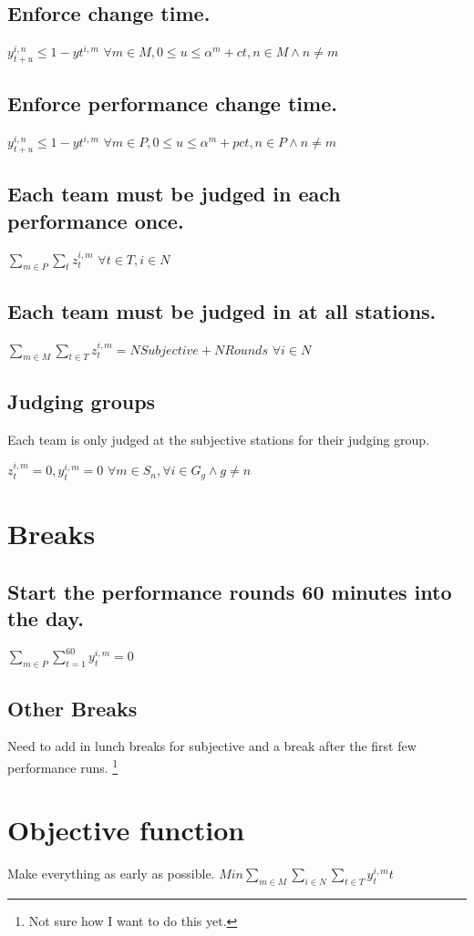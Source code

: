 \documentclass[letterpaper,11pt]{report}
\newcommand{\doccomment}[3]%
{\marginpar{\textcolor{#2}{\bf #1}}%
\footnote{{\color{#2}#3}}%
}
\newcommand{\doccomment}[3]{}
\newcommand{\jpscomment}[1]%
{\doccomment{SCHEWE}{Bittersweet}{#1}}
\begin{document}
\subsection{Enforce change time.}
$y_{t+u}^{i,n} \le 1 - y{t}^{i,m}$
\hfill $\forall m \in M, 0 \le u \le \alpha^{m} + ct, n \in M \wedge n \neq m$

\subsection{Enforce performance change time.}
$y_{t+u}^{i,n} \le 1 - y{t}^{i,m}$
\hfill $\forall m \in P, 0 \le u \le \alpha^{m} + pct, n \in P \wedge n \neq m$

\subsection{Each team must be judged in each performance once.}
$\sum\limits_{m \in P} \sum\limits_{t} z_{t}^{i,m}$
\hfill $\forall t \in T, i \in N$


\subsection{Each team must be judged in at all stations.}
$\sum\limits_{m \in M} \sum\limits_{t \in T} z_{t}^{i,m} = NSubjective +
NRounds$
\hfill $\forall i \in N$

\subsection{Judging groups}
Each team is only judged at the subjective stations for their judging
group.

$z_{t}^{i,m} = 0, y_{t}^{i,m} = 0$
\hfill $\forall m \in S_{n}, \forall i \in G_{g} \wedge g \neq n$

\section{Breaks}
\subsection{Start the performance rounds 60 minutes into the day.}
$\sum\limits_{m \in P} \sum\limits_{t = 1}^{60} y_{t}^{i,m} = 0$

\subsection{Other Breaks}
Need to add in lunch breaks for subjective and a break after the first few
performance runs. \jpscomment{Not sure how I want to do this yet.}

\section{Objective function}
Make everything as early as possible.
$Min \sum\limits_{m \in M} \sum\limits_{i \in N} \sum\limits_{t \in T}
y_{t}^{i,m} t$
\end{document}
